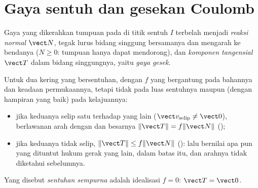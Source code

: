 \section{Gaya sentuh dan gesekan Coulomb}

\begin{definition}\label{def:b2:rigid-body-mechanics:contact}
Gaya yang dikerahkan tumpuan pada  di titik sentuh $I$
terbelah menjadi \emph{reaksi normal} $\vect N$, tegak lurus bidang
singgung bersamanya dan mengarah ke bendanya ($N \ge 0$: tumpuan hanya
dapat mendorong), dan \emph{komponen tangensial} $\vect T$ dalam bidang
singgungnya, yaitu \emph{gaya gesek}.
\end{definition}

\begin{theorem}\label{thm:b2:rigid-body-mechanics:coulomb}
Untuk dua  kering yang bersentuhan, dengan \emph{} $f$ yang bergantung pada bahannya dan keadaan permukaannya, tetapi
tidak pada luas sentuhnya maupun (dengan hampiran yang baik) pada
kelajuannya:
\begin{itemize}
  \item jika keduanya selip satu terhadap yang lain ($\vect v_{\text{selip}} \ne
        \vect 0$),  berlawanan arah dengan  dan besarnya $\|\vect T\| = f\|\vect N\|$ ();
  \item jika keduanya tidak selip, $\|\vect T\| \le f\|\vect N\|$
        ():  lalu bernilai apa pun yang
        dituntut hukum gerak yang lain, dalam batas itu, dan arahnya
        tidak diketahui sebelumnya.
\end{itemize}
Yang disebut \emph{sentuhan sempurna} adalah idealisasi $f = 0$: $\vect T = \vect 0$.
\end{theorem}
\admitted


